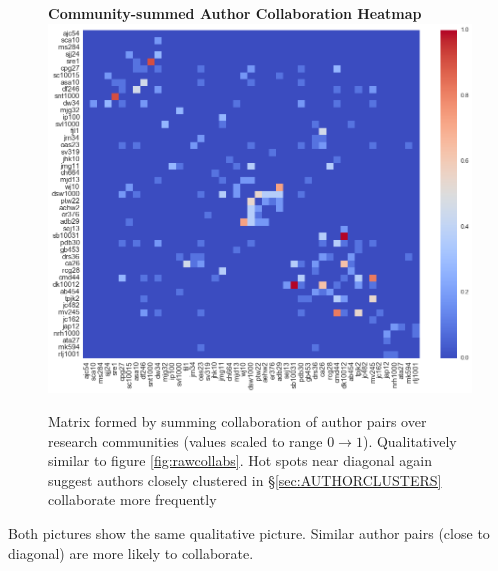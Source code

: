   \begin{figure}
  \centering
  \textbf{Community-summed Author Collaboration Heatmap}
    \includegraphics[width=\textwidth]{Analysis/comm_collabs.png}
    \caption[Community-summed Author Collaboration Heatmap]{Matrix formed by summing collaboration of author pairs over research communities (values scaled to range $0 \rightarrow 1$). Qualitatively similar to figure \ref{fig:rawcollabs}. Hot spots near diagonal again suggest authors closely clustered in \S\ref{sec:AUTHORCLUSTERS} collaborate more frequently }
      \label{fig:collcollabs}

\end{figure}

Both pictures show the same qualitative picture. Similar author pairs (close to diagonal) are more likely to collaborate. 

